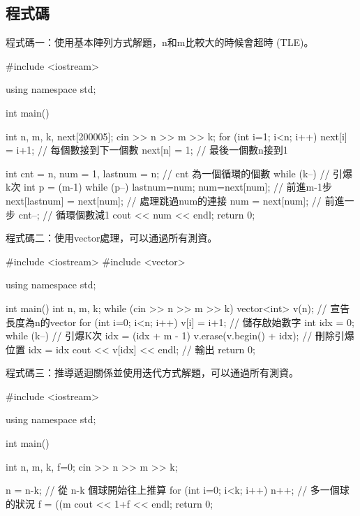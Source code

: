 \subsection{程式碼}
程式碼一：使用基本陣列方式解題，n和m比較大的時候會超時 (TLE)。
\begin{cppcode}
#include <iostream>

using namespace std;

int main()
{
	int n, m, k, next[200005];
	cin >> n >> m >> k;
	for (int i=1; i<n; i++) next[i] = i+1; // 每個數接到下一個數
	next[n] = 1; // 最後一個數n接到1
	
	int cnt = n, num = 1, lastnum = n; // cnt 為一個循環的個數
	while (k--) { // 引爆k次
		int p = (m-1) %
		while (p--) { lastnum=num; num=next[num]; } // 前進m-1步
		next[lastnum] = next[num]; // 處理跳過num的連接
		num = next[num]; // 前進一步
		cnt--; // 循環個數減1
	}
	cout << num << endl;
	return 0;
}
\end{cppcode}

程式碼二：使用vector處理，可以通過所有測資。
\begin{cppcode}
#include <iostream>
#include <vector>

using namespace std;

int main()
{
	int n, m, k;
	while (cin >> n >> m >> k) {
		vector<int> v(n); // 宣告長度為n的vector
		for (int i=0; i<n; i++) v[i] = i+1; // 儲存啟始數字
		int idx = 0;
		while (k--) { // 引爆K次
			idx = (idx + m - 1) %
			v.erase(v.begin() + idx); // 刪除引爆位置
		}
		idx = idx %
		cout << v[idx] << endl; // 輸出
	}
	return 0;
}
\end{cppcode}	

程式碼三：推導遞迴關係並使用迭代方式解題，可以通過所有測資。
\begin{cppcode}
#include <iostream>

using namespace std;

int main()
{
	int n, m, k, f=0;
	cin >> n >> m >> k;
	
	n = n-k; // 從 n-k 個球開始往上推算
	for (int i=0; i<k; i++) {
		n++; // 多一個球的狀況
		f = ((m%
	}
	cout << 1+f << endl;
	return 0;
}
\end{cppcode}

